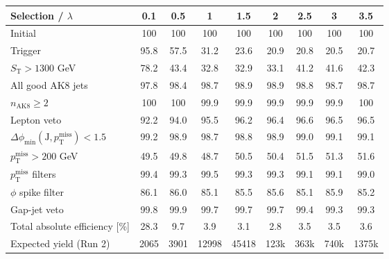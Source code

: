 {\footnotesize\setlength{\tabcolsep}{1.45pt}\renewcommand{\arraystretch}{0.82}%
\begin{tabular}{@{}lcccccccc@{}}
\hline
Selection / $\lambda$ & 0.1 & 0.5 & 1 & 1.5 & 2 & 2.5 & 3 & 3.5 \\
\hline
Initial & 100 & 100 & 100 & 100 & 100 & 100 & 100 & 100 \\
Trigger & 95.8 & 57.5 & 31.2 & 23.6 & 20.9 & 20.8 & 20.5 & 20.7 \\
$S_{\mathrm{T}}>1300$ GeV & 78.2 & 43.4 & 32.8 & 32.9 & 33.1 & 41.2 & 41.6 & 42.3 \\
All good AK8 jets & 97.8 & 98.4 & 98.7 & 98.9 & 98.9 & 98.8 & 98.7 & 98.7 \\
$n_{\mathrm{AK8}}\geq 2$ & 100 & 100 & 99.9 & 99.9 & 99.9 & 99.9 & 99.9 & 100 \\
Lepton veto & 92.2 & 94.0 & 95.5 & 96.2 & 96.4 & 96.6 & 96.5 & 96.5 \\
$\Delta\phi_{\min}(\mathrm{J},p_{\mathrm{T}}^{\mathrm{miss}})<1.5$ & 99.2 & 98.9 & 98.7 & 98.8 & 98.9 & 99.0 & 99.1 & 99.1 \\
$p_{\mathrm{T}}^{\mathrm{miss}}>200$ GeV & 49.5 & 49.8 & 48.7 & 50.5 & 50.4 & 51.5 & 51.3 & 51.6 \\
$p_{\mathrm{T}}^{\mathrm{miss}}$ filters & 99.4 & 99.3 & 99.5 & 99.3 & 99.3 & 99.1 & 99.1 & 99.0 \\
$\phi$ spike filter & 86.1 & 86.0 & 85.1 & 85.5 & 85.6 & 85.1 & 85.9 & 85.2 \\
Gap-jet veto & 99.8 & 99.9 & 99.7 & 99.7 & 99.7 & 99.4 & 99.3 & 99.3 \\
\hline
Total absolute efficiency [\%] & 28.3 & 9.7 & 3.9 & 3.1 & 2.8 & 3.5 & 3.5 & 3.6 \\
\hline
Expected yield (Run 2) & 2065 & 3901 & 12998 & 45418 & 123k & 363k & 740k & 1375k \\
\hline
\end{tabular}%
}
